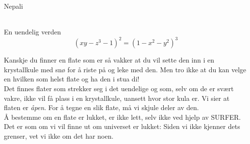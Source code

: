 \documentclass[no]{./../../common/SurferDesc}%
\begin{document}
\footnotesize

\begin{surferPage}
  \begin{surferTitle}Nepali\end{surferTitle}  \\
En uendelig verden \\

\smallskip
\[(x y - z^3 -1)^2= (1 - x^2	- y^2)^3\]

\singlespacing
Kanskje du finner en flate som er så vakker at du vil sette den inn i en krystallkule med snø for å riste på og leke med den. Men tro ikke at du kan velge en hvilken som helst flate og ha den i stua di!
\\
\singlespacing
Det finnes flater som strekker seg i det uendelige og som, selv om de er svært vakre, ikke vil få plass i en krystallkule, uansett hvor stor kula er. Vi sier at flaten er \textit{åpen}. For å tegne en slik flate, må vi skjule deler av den.
\\
\singlespacing
Å bestemme om en flate er lukket, er ikke lett, selv ikke ved hjelp av SURFER. Det er som om vi vil finne ut om universet er lukket: Siden vi ikke kjenner dets grenser, vet vi ikke om det har noen. 
  \begin{surferText}
     \end{surferText}
\end{surferPage}
\end{document}
